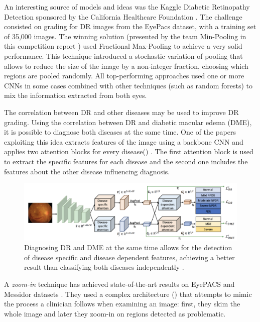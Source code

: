 An interesting source of models and ideas was the Kaggle Diabetic Retinopathy Detection sponsored by the California Healthcare Foundation \cite{diabeticretinopathydetection}. The challenge consisted on grading for DR images from the EyePacs dataset, with a training set of 35,000 images. The winning solution (presented by the team Min-Pooling in this competition report \cite{competitionReport}) used Fractional Max-Pooling \cite{graham2015fractional} to achieve a very solid performance. This technique introduced a stochastic variation of pooling that allows to reduce the size of the image by a non-integer fraction, choosing which regions are pooled randomly. All top-performing approaches used one or more CNNs in some cases combined with other techniques (such as random forests) to mix the information extracted from both eyes.

The correlation between DR and other diseases may be used to improve DR grading. Using the correlation between DR and diabetic macular edema (DME), it is possible to diagnose both diseases at the same time. One of the papers exploiting this idea  extracts features of the image using a backbone CNN and applies two attention blocks for every disease() \cite{li2020canet}. The first attention block is used to extract the specific features for each disease and the second one includes the features about the other disease influencing diagnosis. 

\begin{figure}[tbp]
    \centering
    \includegraphics[width=\textwidth]{figures/chapter3/edema.png}
    \caption{Diagnosing DR and DME at the same time allows for the detection of disease specific and disease dependent features, achieving a better result than classifying both diseases independently \cite{li2020canet}.}
    \label{fig:edema}
\end{figure}

A \textit{zoom-in} technique has achieved state-of-the-art results on EyePACS and Messidor datasets \cite{wang2017zoom}. They used a complex architecture () that attempts to mimic the process a clinician follows when examining an image: first, they skim the whole image and later they zoom-in on regions detected as problematic.

